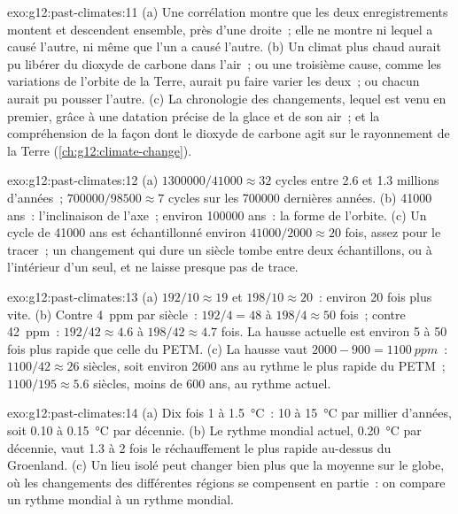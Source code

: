 \begin{solution}{exo:g12:past-climates:11}
(a) Une corrélation montre que les deux enregistrements montent et
descendent ensemble, près d'une droite~; elle ne montre ni lequel a causé
l'autre, ni même que l'un a causé l'autre. (b) Un climat plus chaud aurait
pu libérer du dioxyde de carbone dans l'air~; ou une troisième cause, comme
les variations de l'orbite de la Terre, aurait pu faire varier les deux~;
ou chacun aurait pu pousser l'autre. (c) La chronologie des changements,
lequel est venu en premier, grâce à une datation précise de la glace et de
son air~; et la compréhension de la façon dont le dioxyde de carbone agit
sur le rayonnement de la Terre (\cref{ch:g12:climate-change}).
\end{solution}

\begin{solution}{exo:g12:past-climates:12}
(a) $\num{1300000}/\num{41000} \approx 32$ cycles entre 2.6 et 1.3
millions d'années~; $\num{700000}/\num{98500} \approx 7$ cycles sur les
\num{700000} dernières années. (b) \num{41000} ans~: l'inclinaison de
l'axe~; environ \num{100000} ans~: la forme de l'orbite. (c) Un cycle de
\num{41000} ans est échantillonné environ $\num{41000}/\num{2000} \approx 20$ fois,
assez pour le tracer~; un changement qui dure un siècle tombe entre deux
échantillons, ou à l'intérieur d'un seul, et ne laisse presque pas de
trace.
\end{solution}

\begin{solution}{exo:g12:past-climates:13}
(a) $192/10 \approx 19$ et $198/10 \approx 20$~: environ 20 fois plus vite.
(b) Contre \qty{4}{ppm} par siècle~: $192/4 = 48$ à $198/4 \approx 50$
fois~; contre \qty{42}{ppm}~: $192/42 \approx 4.6$ à $198/42 \approx 4.7$
fois. La hausse actuelle est environ 5 à 50 fois plus rapide que celle du
PETM. (c) La hausse vaut $2000 - 900 = \qty{1100}{ppm}$~: $1100/42 \approx 26$ siècles,
soit environ \num{2600} ans au rythme le plus rapide du PETM~;
$1100/195 \approx 5.6$ siècles, moins de 600 ans, au rythme actuel.
\end{solution}

\begin{solution}{exo:g12:past-climates:14}
(a) Dix fois 1 à \qty{1.5}{\degreeCelsius}~: 10 à \qty{15}{\degreeCelsius}
par millier d'années, soit 0.10 à \qty{0.15}{\degreeCelsius} par décennie.
(b) Le rythme mondial actuel, \qty{0.20}{\degreeCelsius} par décennie, vaut
1.3 à 2 fois le réchauffement le plus rapide au-dessus du Groenland. (c) Un
lieu isolé peut changer bien plus que la moyenne sur le globe, où les
changements des différentes régions se compensent en partie~: on compare
un rythme mondial à un rythme mondial.
\end{solution}

